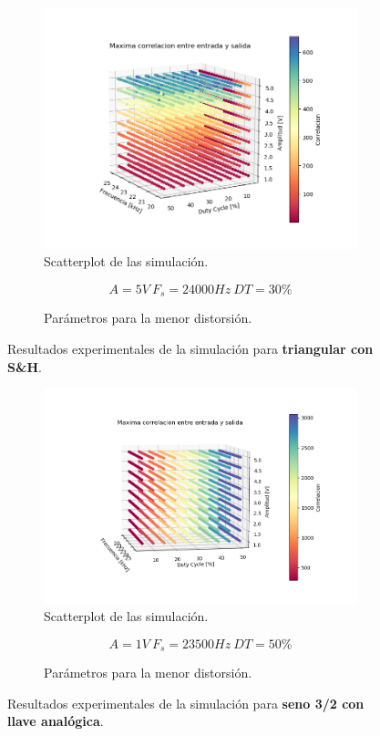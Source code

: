 \begin{figure}[H]
\centering
\begin{subfigure}{\linewidth}
\includegraphics[width=\linewidth]{ImagenesEjercicio6/scatter_sh_triang.png}
\caption{Scatterplot de las simulación.}
\end{subfigure}

\begin{subfigure}{\linewidth}
\[A = 5V \ F_s = 24000Hz \ DT = 30\%\]
\caption{Parámetros para la menor distorsión.}
\end{subfigure}
\label{triang_sh}
\caption{Resultados experimentales de la simulación para \textbf{triangular con S\&H}.}
\end{figure}

\begin{figure}[H]
\centering
\begin{subfigure}{\linewidth}
\includegraphics[width=\linewidth]{ImagenesEjercicio6/scatter_llave_sen32.png}
\caption{Scatterplot de las simulación.}
\end{subfigure}

\begin{subfigure}{\linewidth}
\[A = 1V \ F_s = 23500Hz \ DT = 50\%\]
\caption{Parámetros para la menor distorsión.}
\end{subfigure}
\label{sen32_llave}
\caption{Resultados experimentales de la simulación para \textbf{seno 3/2 con llave analógica}.}
\end{figure}

